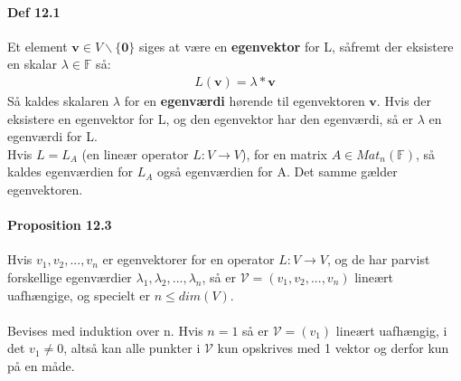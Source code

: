 \documentclass[paper=a4, fontsize=11pt]{scrartcl} %
\begin{document}
	
	\paragraph{Def 12.1} Et element $\mathbf{v}\in V\backslash \{\mathbf{0}\}$ siges at være en \textbf{egenvektor} for L, såfremt der eksistere en skalar $\lambda\in\mathbb{F}$ så:
	\begin{gather*}
		L(\mathbf{v})=\lambda*\mathbf{v}
	\end{gather*}
	Så kaldes skalaren $\lambda$ for en \textbf{egenværdi} hørende til egenvektoren $\mathbf{v}$. Hvis der eksistere en egenvektor for L, og den egenvektor har den egenværdi, så er $\lambda$ en egenværdi for L. \\
	Hvis $L=L_A$ (en lineær operator $L:V\rightarrow V$), for en matrix $A\in Mat_n(\mathbb{F})$, så kaldes egenværdien for $L_A$ også egenværdien for A. Det samme gælder egenvektoren.
	
	\paragraph{Proposition 12.3} Hvis $v_1,v_2,...,v_n$ er egenvektorer for en operator $L:V\rightarrow V$, og de har parvist forskellige egenværdier $\lambda_1, \lambda_2,...,\lambda_n$, så er $\mathcal{V}=(v_1,v_2,...,v_n)$ lineært uafhængige, og specielt er $n\leq dim(V)$. \\ \\
	Bevises med induktion over n. Hvis $n=1$ så er $\mathcal{V}=(v_1)$ lineært uafhængig, i det $v_1\neq0$, altså kan alle punkter i $\mathcal{V}$ kun opskrives med 1 vektor og derfor kun på en måde. \\ \\
	
\end{document}

